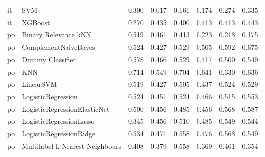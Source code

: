 \begin{tabular}{llllllll}
      it &                             SVM & 0.300 &                     0.017 &                 0.161 &                  0.174 &                                   0.274 &     0.335 \\
      it &                         XGBoost & 0.270 &                     0.435 &                 0.400 &                  0.413 &                                   0.413 &     0.443 \\
      po &            Binary Relevance kNN & 0.519 &                     0.461 &                 0.413 &                  0.223 &                                   0.218 &     0.175 \\
      po &            ComplementNaiveBayes & 0.524 &                     0.427 &                 0.529 &                  0.505 &                                   0.592 &     0.675 \\
      po &                Dummy Classifier & 0.578 &                     0.466 &                 0.529 &                  0.417 &                                   0.500 &     0.549 \\
      po &                             KNN & 0.714 &                     0.549 &                 0.704 &                  0.641 &                                   0.330 &     0.636 \\
      po &                       LinearSVM & 0.519 &                     0.427 &                 0.505 &                  0.437 &                                   0.524 &     0.529 \\
      po &              LogisticRegression & 0.524 &                     0.451 &                 0.524 &                  0.466 &                                   0.515 &     0.553 \\
      po &    LogisticRegressionElasticNet & 0.500 &                     0.456 &                 0.485 &                  0.456 &                                   0.568 &     0.587 \\
      po &         LogisticRegressionLasso & 0.345 &                     0.456 &                 0.510 &                  0.485 &                                   0.549 &     0.544 \\
      po &         LogisticRegressionRidge & 0.534 &                     0.471 &                 0.558 &                  0.476 &                                   0.568 &     0.549 \\
      po & Multilabel k Nearest Neighbours & 0.408 &                     0.379 &                 0.558 &                  0.369 &                                   0.461 &     0.354 \\

\end{tabular}
